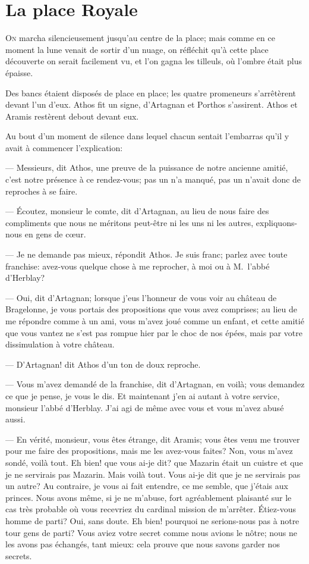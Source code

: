\chapter{La place Royale}

\lettrine{O}{n} marcha silencieusement jusqu'au centre de la place; mais comme en ce moment la lune venait de sortir d'un nuage, on réfléchit qu'à cette place découverte on serait facilement vu, et l'on gagna les tilleuls, où l'ombre était plus épaisse.

Des bancs étaient disposés de place en place; les quatre promeneurs s'arrêtèrent devant l'un d'eux. Athos fit un signe, d'Artagnan et Porthos s'assirent. Athos et Aramis restèrent debout devant eux.

Au bout d'un moment de silence dans lequel chacun sentait l'embarras qu'il y avait à commencer l'explication:

— Messieurs, dit Athos, une preuve de la puissance de notre ancienne amitié, c'est notre présence à ce rendez-vous; pas un n'a manqué, pas un n'avait donc de reproches à se faire.

— Écoutez, monsieur le comte, dit d'Artagnan, au lieu de nous faire des compliments que nous ne méritons peut-être ni les uns ni les autres, expliquons-nous en gens de cœur.

— Je ne demande pas mieux, répondit Athos. Je suis franc; parlez avec toute franchise: avez-vous quelque chose à me reprocher, à moi ou à M.~l'abbé d'Herblay?

— Oui, dit d'Artagnan; lorsque j'eus l'honneur de vous voir au château de Bragelonne, je vous portais des propositions que vous avez comprises; au lieu de me répondre comme à un ami, vous m'avez joué comme un enfant, et cette amitié que vous vantez ne s'est pas rompue hier par le choc de nos épées, mais par votre dissimulation à votre château.

— D'Artagnan! dit Athos d'un ton de doux reproche.

— Vous m'avez demandé de la franchise, dit d'Artagnan, en voilà; vous demandez ce que je pense, je vous le dis. Et maintenant j'en ai autant à votre service, monsieur l'abbé d'Herblay. J'ai agi de même avec vous et vous m'avez abusé aussi.

— En vérité, monsieur, vous êtes étrange, dit Aramis; vous êtes venu me trouver pour me faire des propositions, mais me les avez-vous faites? Non, vous m'avez sondé, voilà tout. Eh bien! que vous ai-je dit? que Mazarin était un cuistre et que je ne servirais pas Mazarin. Mais voilà tout. Vous ai-je dit que je ne servirais pas un autre? Au contraire, je vous ai fait entendre, ce me semble, que j'étais aux princes. Nous avons même, si je ne m'abuse, fort agréablement plaisanté sur le cas très probable où vous recevriez du cardinal mission de m'arrêter. Étiez-vous homme de parti? Oui, sans doute. Eh bien! pourquoi ne serions-nous pas à notre tour gens de parti? Vous aviez votre secret comme nous avions le nôtre; nous ne les avons pas échangés, tant mieux: cela prouve que nous savons garder nos secrets.

